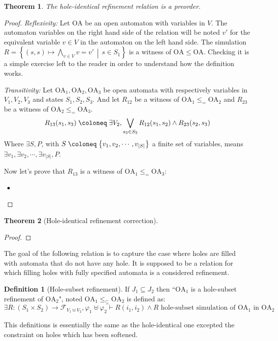 \documentclass{article}
\theoremstyle{plain}
\newtheorem{thm}{Theorem}
\theoremstyle{definition}
\newtheorem{defi}{Definition}
\newcommand\nmm[1]{\(\displaystyle #1\)} %
\newcommand\mpar[1]{{\left(#1\right)}}
\newcommand\mbrc[1]{{\left\{#1\right\}}}
\newcommand\card[1]{{\left|#1\right|}}
\newcommand\midbar{\,\middle|\,}
\newcommand\mset[2]{\mbrc{#1\midbar #2}}
\newcommand\defobject{\DOTSB\;{\coloneq}\;}
\newcommand\formulae{{\mathcal{F}}}
\begin{document}
\begin{thm} The hole-identical refinement relation is a preorder. \end{thm}
\begin{proof}
\item \emph{Reflexivity:} Let \(\mathrm{OA}\) be an open automaton with variables in \(V\).
	The automaton variables on the right hand side of the relation will be noted \(v'\) for the equivalent variable \(v \in V\) in the automaton on the left hand side.
	The simulation \nmm{R = \mset{\mpar{s, s} \mapsto \bigwedge_{v \in V} v = v'}{s \in S_1}} is a witness of \(\mathrm{OA} \leq \mathrm{OA}\).
	Checking it is a simple exercise left to the reader in order to understand how the definition works.
\item \emph{Transitivity:} Let \(\mathrm{OA}_1, \mathrm{OA}_2, \mathrm{OA}_3\) be open automata with respectively variables in \(V_1, V_2, V_3\) and states \(S_1, S_2, S_3\).
	And let \(R_{12}\) be a witness of \(\mathrm{OA}_1 \leq_= \mathrm{OA}_2\) and \(R_{23}\) be a witness of \(\mathrm{OA}_2 \leq_= \mathrm{OA}_3\).
	\[ R_{13}\mpar{s_1, s_3} \defobject \exists V_2, \bigvee_{s_2 \in S_2} R_{12}\mpar{s_1, s_2} \wedge R_{23}\mpar{s_2, s_3} \]
	Where \(\exists S, P\), with \(S \defobject \mbrc{v_1, v_2, \cdots, v_\card{S}}\) a finite set of variables, means \(\exists v_1, \exists v_2, \cdots, \exists v_\card{S}, P\).

	Now let's prove that \(R_{13}\) is a witness of \(\mathrm{OA}_1 \leq_= \mathrm{OA}_3\):
	\begin{itemize}
	\item %
	\end{itemize}
\end{proof}
\begin{thm}[Hole-identical refinement correction]
\end{thm}
\begin{proof}
\end{proof}

The goal of the following relation is to capture the case where holes are filled with automata that do not have any hole.
It is supposed to be a relation for which filling holes with fully specified automata is a considered refinement.
\begin{defi}[Hole-subset refinement]
If \(J_1 \subseteq J_2\) then ``\(\mathrm{OA}_1\) is a hole-subset refinement of \(\mathrm{OA}_2\)", noted \(\mathrm{OA}_1 \leq_\subseteq \mathrm{OA}_2\) is defined as:
\[ \exists R: \mpar{S_1 \times S_2} \to \formulae_{V_1 \uplus V_2}, \varphi_1 \uplus \varphi_2 \vdash R\mpar{i_1, i_2} \wedge R \text{ hole-subset simulation of } \mathrm{OA}_1 \text{ in } \mathrm{OA}_2 \]
\end{defi}
This definitions is essentially the same as the hole-identical one excepted the constraint on holes which has been softened.
\end{document}
